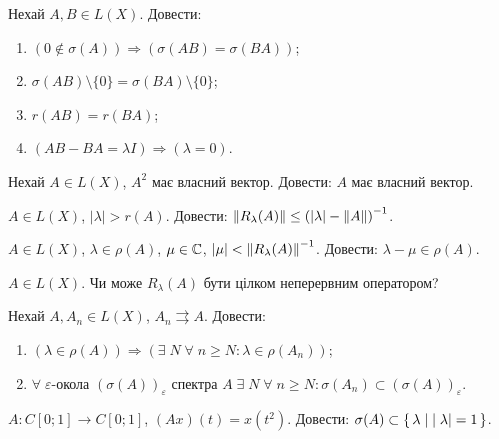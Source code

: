 \begin{exercise}
    Нехай $A, B \in L(X)$. Довести:
    \begin{enumerate}
        \item $\left( 0 \notin \sigma(A)\right) \Rightarrow \left( \sigma(AB) = \sigma(BA)\right)$;
        \item $\sigma(AB) \setminus \{ 0 \} = \sigma(BA) \setminus \{ 0 \}$;
        \item $r(AB) = r(BA)$;
        \item $\left( AB - BA = \lambda I \right) \Rightarrow \left( \lambda = 0\right)$.
    \end{enumerate}
\end{exercise}

\begin{exercise}
    Нехай $A \in L(X)$, $A^2$ має власний вектор. Довести: $A$ має власний вектор.
\end{exercise}

\begin{exercise}
    $A \in L(X)$, $| \lambda | > r(A)$. 
    Довести: $\left\lVert R_\lambda (A)\right\rVert \leq \left( | \lambda | - \left\lVert A\right\rVert\right)^{-1}$.
\end{exercise}

\begin{exercise}\label{N:1_7_25}
    $A \in L(X)$, $\lambda \in \rho (A)$, $\mu \in \mathbb{C}$, $|\mu| < \left\lVert R_\lambda (A)\right\rVert^{-1}$.
    Довести: $\lambda - \mu \in \rho (A)$.
\end{exercise}

\begin{exercise}
    $A \in L(X)$. Чи може $R_\lambda (A)$ бути цілком неперервним оператором?
\end{exercise}

\begin{exercise}\label{N:1_7_27}
    Нехай $A, A_n \in L(X)$, $A_n \rightrightarrows A$. Довести:
    \begin{enumerate}
        \item $\left( \lambda \in \rho(A) \right) \Rightarrow \left( \exists \; N \; \forall \; n \geq N : \lambda \in \rho(A_n) \right)$;
        \item $\forall \; \varepsilon\text{-окола } (\sigma(A))_\varepsilon \text{ спектра } A \; \exists \; N \; \forall \; n \geq N : \sigma(A_n) \subset (\sigma(A))_\varepsilon $.
    \end{enumerate}
\end{exercise}

\begin{exercise}\label{N:1_7_28}
    $A : C[0;1] \to C[0;1]$, $(Ax)(t) = x(t^2)$. Довести: $\sigma(A) \subset \set{\lambda \mid |\lambda| = 1}$.
\end{exercise}

